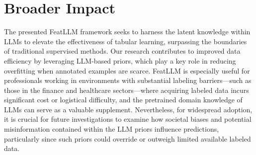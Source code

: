 \section{Broader Impact} The presented \textsf{FeatLLM} framework seeks to harness the latent knowledge within LLMs to elevate the effectiveness of tabular learning, surpassing the boundaries of traditional supervised methods. Our research contributes to improved data efficiency by leveraging LLM-based priors, which play a key role in reducing overfitting when annotated examples are scarce. \textsf{FeatLLM} is especially useful for professionals working in environments with substantial labeling barriers—such as those in the finance and healthcare sectors—where acquiring labeled data incurs significant cost or logistical difficulty, and the pretrained domain knowledge of LLMs can serve as a valuable supplement. Nevertheless, for widespread adoption, it is crucial for future investigations to examine how societal biases and potential misinformation contained within the LLM priors influence predictions, particularly since such priors could override or outweigh limited available labeled data.

